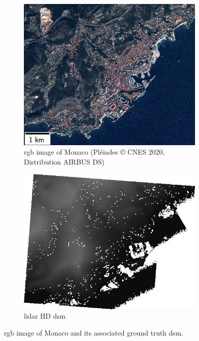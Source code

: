 \begin{figure}
    \centering
    \begin{subfigure}[t]{0.48\linewidth}
        \flushleft
        \includegraphics[width=\linewidth]{Images/Chap_6/miniature_Monaco.png}
        \caption{\acrshort{rgb} image of Monaco (Pléiades © CNES 2020, Distribution AIRBUS DS)}
        \label{fig:miniature_Monaco_rgb}
    \end{subfigure}\hfill
    \begin{subfigure}[t]{0.48\linewidth}
        \flushright
        \includegraphics[width=\linewidth]{Images/Chap_6/miniature_Monaco_gt.png}
        \caption{\acrshort{lidar} HD \acrshort{dsm}}
        \label{fig:miniature_Monaco_gt}
    \end{subfigure}
    \caption{\acrshort{rgb} image of Monaco and its associated ground truth \acrshort{dsm}.}
    \label{fig:miniature_Monaco}
\end{figure}

